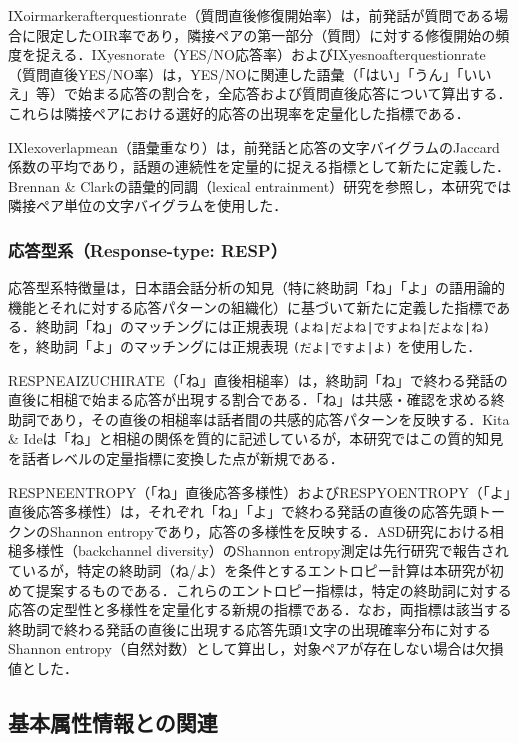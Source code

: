 \documentclass[dvipdfmx,11pt,a4paper]{bxjsarticle}
\renewcommand{\_}{\paperorigunderscore\allowbreak}%
\begin{document}
IX\_oirmarker\_after\_question\_rate（質問直後修復開始率）は，前発話が質問である場合に限定したOIR率であり，隣接ペアの第一部分（質問）に対する修復開始の頻度を捉える．IX\_yesno\_rate（YES/NO応答率）およびIX\_yesno\_after\_question\_rate（質問直後YES/NO率）は，YES/NOに関連した語彙（「はい」「うん」「いいえ」等）で始まる応答の割合を，全応答および質問直後応答について算出する．これらは隣接ペアにおける選好的応答の出現率を定量化した指標である．

IX\_lex\_overlap\_mean（語彙重なり）は，前発話と応答の文字バイグラムのJaccard係数の平均であり，話題の連続性を定量的に捉える指標として新たに定義した．Brennan \& Clark\cite{brennan1996}の語彙的同調（lexical entrainment）研究を参照し，本研究では隣接ペア単位の文字バイグラムを使用した．

\subsubsection{応答型系（Response-type: RESP）}
応答型系特徴量は，日本語会話分析の知見（特に終助詞「ね」「よ」の語用論的機能とそれに対する応答パターンの組織化）に基づいて新たに定義した指標である．終助詞「ね」のマッチングには正規表現 \texttt{(よね|だよね|ですよね|だよな|ね)} を，終助詞「よ」のマッチングには正規表現 \texttt{(だよ|ですよ|よ)} を使用した．

RESP\_NE\_AIZUCHI\_RATE（「ね」直後相槌率）は，終助詞「ね」で終わる発話の直後に相槌で始まる応答が出現する割合である．「ね」は共感・確認を求める終助詞であり，その直後の相槌率は話者間の共感的応答パターンを反映する．Kita \& Ide\cite{kita2007}は「ね」と相槌の関係を質的に記述しているが，本研究ではこの質的知見を話者レベルの定量指標に変換した点が新規である．

RESP\_NE\_ENTROPY（「ね」直後応答多様性）およびRESP\_YO\_ENTROPY（「よ」直後応答多様性）は，それぞれ「ね」「よ」で終わる発話の直後の応答先頭トークンのShannon entropyであり，応答の多様性を反映する．ASD研究における相槌多様性（backchannel diversity）のShannon entropy測定は先行研究で報告されているが\cite{wehrle2024}，特定の終助詞（ね/よ）を条件とするエントロピー計算は本研究が初めて提案するものである．これらのエントロピー指標は，特定の終助詞に対する応答の定型性と多様性を定量化する新規の指標である．なお，両指標は該当する終助詞で終わる発話の直後に出現する応答先頭1文字の出現確率分布に対するShannon entropy（自然対数）として算出し，対象ペアが存在しない場合は欠損値とした．


\subsection{基本属性情報との関連}
\label{sec:pred_demographic}
\end{document}
